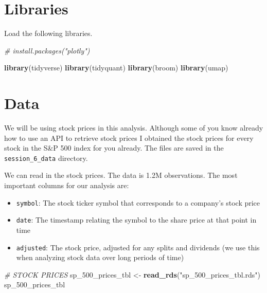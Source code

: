 \documentclass[
]{article}
\newenvironment{Shaded}{\begin{snugshade}}{\end{snugshade}}
\newcommand{\CommentTok}[1]{\textcolor[rgb]{0.56,0.35,0.01}{\textit{#1}}}
\newcommand{\DecValTok}[1]{\textcolor[rgb]{0.00,0.00,0.81}{#1}}
\newcommand{\KeywordTok}[1]{\textcolor[rgb]{0.13,0.29,0.53}{\textbf{#1}}}
\newcommand{\NormalTok}[1]{#1}
\newcommand{\StringTok}[1]{\textcolor[rgb]{0.31,0.60,0.02}{#1}}
\providecommand{\tightlist}{%
  \setlength{\itemsep}{0pt}\setlength{\parskip}{0pt}}
\begin{document}
\hypertarget{libraries}{%
\section{Libraries}\label{libraries}}

Load the following libraries.

\begin{Shaded}
\begin{Highlighting}[]
\CommentTok{# install.packages("plotly")}

\KeywordTok{library}\NormalTok{(tidyverse)}
\KeywordTok{library}\NormalTok{(tidyquant)}
\KeywordTok{library}\NormalTok{(broom)}
\KeywordTok{library}\NormalTok{(umap)}
\end{Highlighting}
\end{Shaded}

\hypertarget{data}{%
\section{Data}\label{data}}

We will be using stock prices in this analysis. Although some of you
know already how to use an API to retrieve stock prices I obtained the
stock prices for every stock in the S\&P 500 index for you already. The
files are saved in the \texttt{session\_6\_data} directory.

We can read in the stock prices. The data is 1.2M observations. The most
important columns for our analysis are:

\begin{itemize}
\tightlist
\item
  \texttt{symbol}: The stock ticker symbol that corresponds to a
  company's stock price
\item
  \texttt{date}: The timestamp relating the symbol to the share price at
  that point in time
\item
  \texttt{adjusted}: The stock price, adjusted for any splits and
  dividends (we use this when analyzing stock data over long periods of
  time)
\end{itemize}

\begin{Shaded}
\begin{Highlighting}[]
\CommentTok{# STOCK PRICES}
\NormalTok{sp_}\DecValTok{500}\NormalTok{_prices_tbl <-}\StringTok{ }\KeywordTok{read_rds}\NormalTok{(}\StringTok{"sp_500_prices_tbl.rds"}\NormalTok{)}
\NormalTok{sp_}\DecValTok{500}\NormalTok{_prices_tbl}
\end{Highlighting}
\end{Shaded}
\end{document}
